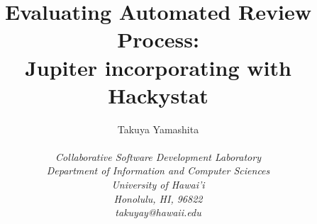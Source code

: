 \documentclass[11pt,proposal,times,thesis,actual]{uhthesis2e}
\begin{document}
\title{Evaluating Automated Review Process:  \\ Jupiter incorporating with Hackystat}
\author{\protect\begin{tabular}{ccc}
Takuya Yamashita\\
\end{tabular}\\
\em Collaborative Software Development Laboratory\\
\em Department of Information and Computer Sciences\\
\em University of Hawai'i\\
\em Honolulu, HI, 96822\\
\em takuyay@hawaii.edu}  
  \othermembers{}
  \maketitle
\thispagestyle{empty}


%
%
%

%




\end{document}

